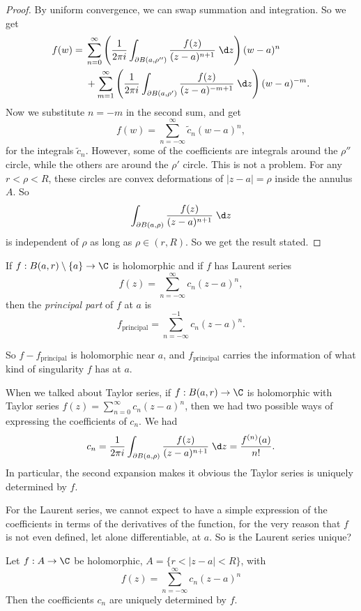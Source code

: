 \documentclass[a4paper]{article}
\begin{document}
\begin{proof}
  By uniform convergence, we can swap summation and integration. So we get
  \begin{align*}
    f(w) ={}& \sum_{n = 0}^\infty \left(\frac{1}{2 \pi i} \int_{\partial B(a, \rho'')} \frac{f(z)}{(z - a)^{n + 1}} \;\d z\right) (w - a)^n \\
    &+ \sum_{m = 1}^\infty \left(\frac{1}{2\pi i} \int_{\partial B(a, \rho')}\frac{f(z)}{(z - a)^{-m + 1}} \;\d z\right) (w - a)^{-m}.
  \end{align*}
  Now we substitute $n = -m$ in the second sum, and get
  \[
    f(w) = \sum_{n = -\infty}^\infty \tilde{c}_n (w - a)^n,
  \]
  for the integrals $\tilde{c}_n$. However, some of the coefficients are integrals around the $\rho''$ circle, while the others are around the $\rho'$ circle. This is not a problem. For any $r < \rho < R$, these circles are convex deformations of $|z - a| = \rho$ inside the annulus $A$. So
  \[
    \int_{\partial B(a, \rho)} \frac{f(z)}{(z - a)^{n + 1}} \;\d z
  \]
  is independent of $\rho$ as long as $\rho \in (r, R)$. So we get the result stated.
\end{proof}

\begin{defi}
  If $f: B(a, r)\setminus \{a\} \to \C$ is holomorphic and if $f$ has Laurent series
  \[
    f(z) = \sum_{n = -\infty}^\infty c_n (z - a)^n,
  \]
  then the \emph{principal part} of $f$ at $a$ is
  \[
    f_{\mathrm{principal}} = \sum_{n = -\infty}^{-1} c_n (z - a)^n.
  \]
\end{defi}
So $f - f_{\mathrm{principal}}$ is holomorphic near $a$, and $f_{\mathrm{principal}}$ carries the information of what kind of singularity $f$ has at $a$.

When we talked about Taylor series, if $f: B(a, r) \to \C$ is holomorphic with Taylor series $f(z) = \sum_{n = 0}^\infty c_n(z - a)^n$, then we had two possible ways of expressing the coefficients of $c_n$. We had
\[
  c_n = \frac{1}{2\pi i} \int_{\partial B(a, \rho)} \frac{f(z)}{(z - a)^{n + 1}}\;\d z = \frac{f^{(n)}(a)}{n!}.
\]
In particular, the second expansion makes it obvious the Taylor series is uniquely determined by $f$.

For the Laurent series, we cannot expect to have a simple expression of the coefficients in terms of the derivatives of the function, for the very reason that $f$ is not even defined, let alone differentiable, at $a$. So is the Laurent series unique?

\begin{lemma}
  Let $f: A \to \C$ be holomorphic, $A = \{r < |z - a| < R\}$, with
  \[
    f(z) = \sum_{n = -\infty}^{\infty} c_n(z - a)^n
  \]
  Then the coefficients $c_n$ are uniquely determined by $f$.
\end{lemma}
\end{document}

